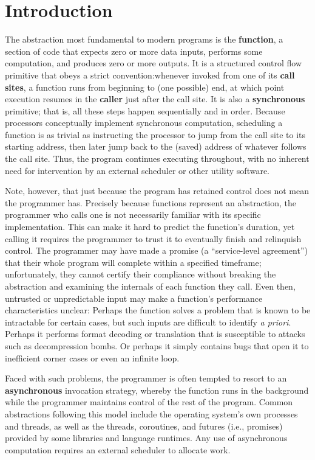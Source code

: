 \chapter{Introduction}

The abstraction most fundamental to modern programs is the \textbf{function}, a
section of code that expects zero or more data inputs, performs some computation, and
produces zero or more outputs.  It is a structured control flow primitive that obeys
a strict convention:\@ whenever invoked from one of its \textbf{call sites}, a
function runs from beginning to (one possible) end, at which point execution resumes
in the \textbf{caller} just after the call site.  It is also a \textbf{synchronous}
primitive; that is, all these steps happen sequentially and in order.  Because
processors conceptually implement synchronous computation, scheduling a function is
as trivial as instructing the processor to jump from the call site to its starting
address, then later jump back to the (saved) address of whatever follows the call
site.  Thus,
the program continues executing throughout, with no inherent need for intervention by
an external scheduler or other utility software.

Note, however, that just because the program has retained control does not mean the
programmer has.  Precisely because functions represent an abstraction, the programmer
who calls one is not necessarily familiar with its specific implementation.  This can
make it hard to predict the function's duration, yet calling it requires the
programmer to trust it to eventually finish and relinquish control.  The programmer
may have made a promise (a ``service-level agreement'') that their whole program
will complete within a specified timeframe; unfortunately, they cannot certify their
compliance without breaking the abstraction and examining the internals of each
function they call.  Even then, untrusted or unpredictable input may make a
function's performance characteristics unclear:  Perhaps the function solves a
problem that is
known to be intractable for certain cases, but such inputs are difficult to identify
\textit{a priori}.  Perhaps it performs format decoding or translation that is
susceptible to attacks such as decompression bombs.  Or perhaps it simply contains
bugs that open it to inefficient corner cases or even an infinite loop.

Faced with such problems, the programmer is often tempted to resort to an
\textbf{asynchronous} invocation strategy, whereby the function runs in the
background while the programmer maintains control of the rest of the program.  Common
abstractions following this model include the operating system's own processes and
threads, as well as the threads, coroutines, and futures (i.e., promises) provided by
some libraries and language runtimes.  Any use of asynchronous computation requires
an external scheduler to allocate work.

